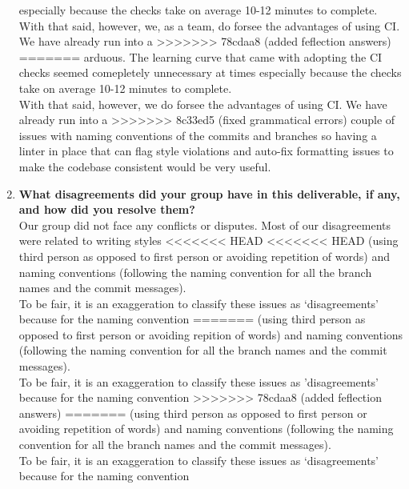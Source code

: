 \documentclass{article}
\begin{document}
\begin{enumerate}
    especially because the checks take on average 10-12 minutes to complete.\\
    \newline
    With that said, however, we, as a team, do forsee the advantages of using CI. We have already run into a
>>>>>>> 78cdaa8 (added feflection answers)
=======
    arduous. The learning curve that came with adopting the CI checks seemed comepletely unnecessary at times
    especially because the checks take on average 10-12 minutes to complete.\\
    \newline
    With that said, however, we do forsee the advantages of using CI. We have already run into a
>>>>>>> 8c33ed5 (fixed grammatical errors)
    couple of issues with naming conventions of the commits and branches so having a linter in place that can
    flag style violations and auto-fix formatting issues to make the codebase consistent would be very useful.
    \item \textbf{What disagreements did your group have in this deliverable, if any,
    and how did you resolve them?}\\
    \newline
    Our group did not face any conflicts or disputes. Most of our disagreements were related to writing styles
<<<<<<< HEAD
<<<<<<< HEAD
    (using third person as opposed to first person or avoiding repetition of words) and naming conventions (following
    the naming convention for all the branch names and the commit messages).\\
    \newline
    To be fair, it is an exaggeration to classify these issues as `disagreements' because for the naming convention 
=======
    (using third person as opposed to first person or avoiding repition of words) and naming conventions (following
    the naming convention for all the branch names and the commit messages).\\
    \newline
    To be fair, it is an exaggeration to classify these issues as 'disagreements' because for the naming convention 
>>>>>>> 78cdaa8 (added feflection answers)
=======
    (using third person as opposed to first person or avoiding repetition of words) and naming conventions (following
    the naming convention for all the branch names and the commit messages).\\
    \newline
    To be fair, it is an exaggeration to classify these issues as `disagreements' because for the naming convention 

\end{enumerate}
\end{document}
